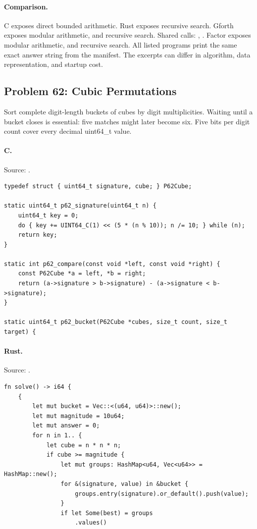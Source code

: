 \paragraph{Comparison.}
C exposes direct bounded arithmetic. Rust exposes recursive search. Gforth exposes modular arithmetic, and recursive search. Shared calls: \texttt{}, \texttt{}. Factor exposes modular arithmetic, and recursive search.
All listed programs print the same exact answer string from the manifest. The excerpts can differ in algorithm, data representation, and startup cost.

\subsection{Problem 62: Cubic Permutations}
\label{walkthrough:p62}
Sort complete digit-length buckets of cubes by digit multiplicities. Waiting until a bucket closes is essential: five matches might later become six. Five bits per digit count cover every decimal uint64\_t value.

\paragraph{C.} Source: .
\begin{lstlisting}
typedef struct { uint64_t signature, cube; } P62Cube;

static uint64_t p62_signature(uint64_t n) {
    uint64_t key = 0;
    do { key += UINT64_C(1) << (5 * (n % 10)); n /= 10; } while (n);
    return key;
}

static int p62_compare(const void *left, const void *right) {
    const P62Cube *a = left, *b = right;
    return (a->signature > b->signature) - (a->signature < b->signature);
}

static uint64_t p62_bucket(P62Cube *cubes, size_t count, size_t target) {
\end{lstlisting}

\paragraph{Rust.} Source: .
\begin{lstlisting}
fn solve() -> i64 {
    {
        let mut bucket = Vec::<(u64, u64)>::new();
        let mut magnitude = 10u64;
        let mut answer = 0;
        for n in 1.. {
            let cube = n * n * n;
            if cube >= magnitude {
                let mut groups: HashMap<u64, Vec<u64>> = HashMap::new();
                for &(signature, value) in &bucket {
                    groups.entry(signature).or_default().push(value);
                }
                if let Some(best) = groups
                    .values()
\end{lstlisting}

